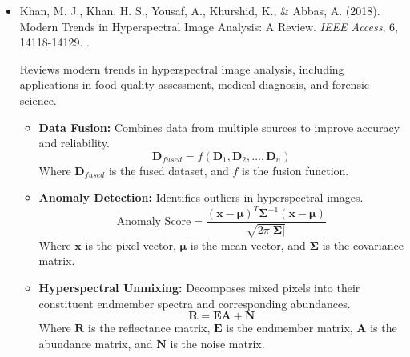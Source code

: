 \documentclass[10pt,svgnames,fragile]{beamer}
\begin{document}
\begin{frame}{}
\tiny
\begin{itemize}

   \item Khan, M. J., Khan, H. S., Yousaf, A., Khurshid, K., & Abbas, A. (2018). Modern Trends in Hyperspectral Image Analysis: A Review. \textit{IEEE Access}, 6, 14118-14129. \href{https://doi.org/10.1109/ACCESS.2018.2812999}{\color{blue}{DOI: 10.1109/ACCESS.2018.2812999}}.
   \cite{khanModernTrendsHyperspectral2018}
   
    {\color{gray}Reviews modern trends in hyperspectral image analysis, including applications in food quality assessment, medical diagnosis, and forensic science.}
    \begin{itemize} \tiny
    \item \textbf{Data Fusion:} Combines data from multiple sources to improve accuracy and reliability.
    \[
    \mathbf{D}_{fused} = f(\mathbf{D}_1, \mathbf{D}_2, \ldots, \mathbf{D}_n)
    \]
    Where \( \mathbf{D}_{fused} \) is the fused dataset, and \( f \) is the fusion function.
    \item \textbf{Anomaly Detection:} Identifies outliers in hyperspectral images.
    \[
    \text{Anomaly Score} = \frac{(\mathbf{x} - \boldsymbol{\mu})^T \boldsymbol{\Sigma}^{-1} (\mathbf{x} - \boldsymbol{\mu})}{\sqrt{2 \pi |\boldsymbol{\Sigma}|}}
    \]
    Where \( \mathbf{x} \) is the pixel vector, \( \boldsymbol{\mu} \) is the mean vector, and \( \boldsymbol{\Sigma} \) is the covariance matrix.
    \item \textbf{Hyperspectral Unmixing:} Decomposes mixed pixels into their constituent endmember spectra and corresponding abundances.
    \[
    \mathbf{R} = \mathbf{EA} + \mathbf{N}
    \]
    Where \( \mathbf{R} \) is the reflectance matrix, \( \mathbf{E} \) is the endmember matrix, \( \mathbf{A} \) is the abundance matrix, and \( \mathbf{N} \) is the noise matrix.
\end{itemize}

\end{itemize}
\end{frame}
\end{document}
